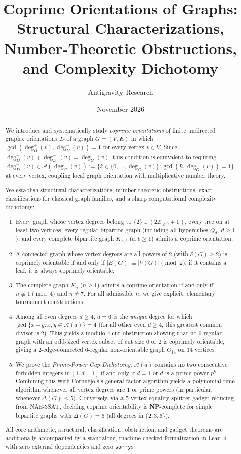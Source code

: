\documentclass[11pt,a4paper]{article}
\title{\textbf{Coprime Orientations of Graphs:\\
Structural Characterizations, Number-Theoretic Obstructions,\\
and Complexity Dichotomy}}
\author{Antigravity Research}
\date{November 2026}
\theoremstyle{definition}
\theoremstyle{remark}
\newcommand{\Z}{\mathbb{Z}}
\newcommand{\outdeg}{\deg^{+}}
\newcommand{\indeg}{\deg^{-}}
\newcommand{\Aset}{\mathcal{A}}
\begin{document}
\maketitle

\begin{abstract}
We introduce and systematically study \emph{coprime orientations} of finite undirected graphs: orientations $D$ of a graph $G = (V, E)$ in which $\gcd(\outdeg_D(v), \indeg_D(v)) = 1$ for every vertex $v \in V$. Since $\outdeg_D(v) + \indeg_D(v) = \deg_G(v)$, this condition is equivalent to requiring $\outdeg_D(v) \in \Aset(\deg_G(v)) := \{k \in \{0,\dots,\deg_G(v)\} : \gcd(k,\deg_G(v)) = 1\}$ at every vertex, coupling local graph orientation with multiplicative number theory.

We establish structural characterizations, number-theoretic obstructions, exact classifications for classical graph families, and a sharp computational complexity dichotomy:
\begin{enumerate}[leftmargin=2em,itemsep=2pt]
  \item Every graph whose vertex degrees belong to $\{2\} \cup (2\Z_{\ge 0} + 1)$, every tree on at least two vertices, every regular bipartite graph (including all hypercubes $Q_d$, $d \ge 1$), and every complete bipartite graph $K_{a,b}$ ($a,b \ge 1$) admits a coprime orientation.
  \item A connected graph whose vertex degrees are all powers of $2$ (with $\delta(G) \ge 2$) is coprimely orientable if and only if $|E(G)| \equiv |V(G)| \pmod{2}$; if it contains a leaf, it is always coprimely orientable.
  \item The complete graph $K_n$ ($n \ge 1$) admits a coprime orientation if and only if $n \not\equiv 1 \pmod{4}$ and $n \neq 7$. For all admissible $n$, we give explicit, elementary tournament constructions.
  \item Among all even degrees $d \ge 4$, $d = 6$ is the \emph{unique} degree for which $\gcd\{x - y : x, y \in \Aset(d)\} = 4$ (for all other even $d \ge 4$, this greatest common divisor is $2$). This yields a modulo-$4$ cut obstruction showing that no $6$-regular graph with an odd-sized vertex subset of cut size $0$ or $2$ is coprimely orientable, giving a $2$-edge-connected $6$-regular non-orientable graph $G_{14}$ on $14$ vertices.
  \item We prove the \emph{Prime-Power Gap Dichotomy}: $\Aset(d)$ contains no two consecutive forbidden integers in $[1, d-1]$ if and only if $d = 1$ or $d$ is a prime power $p^k$. Combining this with Cornu\'ejols's general factor algorithm yields a polynomial-time algorithm whenever all vertex degrees are $1$ or prime powers (in particular, whenever $\Delta(G) \le 5$). Conversely, via a $5$-vertex equality splitter gadget reducing from \textsc{NAE-3SAT}, deciding coprime orientability is \textbf{NP}-complete for simple bipartite graphs with $\Delta(G) = 6$ (all degrees in $\{2,3,6\}$).
\end{enumerate}
All core arithmetic, structural, classification, obstruction, and gadget theorems are additionally accompanied by a standalone, machine-checked formalization in Lean~4 with zero external dependencies and zero \texttt{sorry}s.
\end{abstract}
\end{document}
